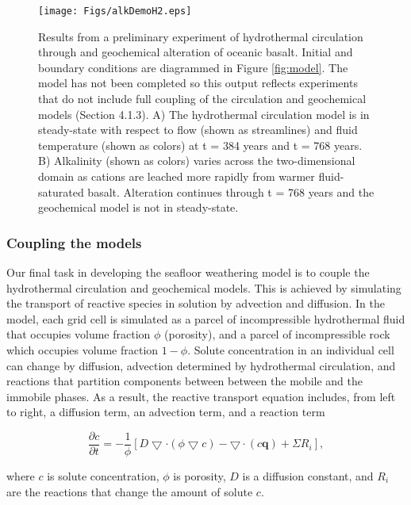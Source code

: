 \documentclass[authoryear,round,12pt]{article}
\begin{document}
\begin{figure}[h!]
\begin{center}
\texttt{[image: Figs/alkDemoH2.eps]}
\end{center}
\caption{Results from a preliminary experiment of hydrothermal circulation through and geochemical alteration of oceanic basalt. Initial and boundary conditions are diagrammed in Figure \ref{fig:model}. The model has not been completed so this output reflects experiments that do not include full coupling of the circulation and geochemical models (Section 4.1.3). A) The hydrothermal circulation model is in steady-state with respect to flow (shown as streamlines) and fluid temperature (shown as colors) at t = 384 years and t = 768 years. B) Alkalinity (shown as colors) varies across the two-dimensional domain as cations are leached more rapidly from warmer fluid-saturated basalt. Alteration continues through t = 768 years and the geochemical model is not in steady-state.}
\label{fig:alkDemoH}
\end{figure}

\subsubsection{Coupling the models}
\label{sec:coupling}

Our final task in developing the seafloor weathering model is to
couple the hydrothermal circulation and geochemical models. 
This is achieved by simulating the transport of reactive species 
in solution by advection and diffusion. In the
model, each grid cell is simulated as a parcel of incompressible
hydrothermal fluid that occupies volume fraction $\phi$ (porosity),
and a parcel of incompressible rock which occupies volume fraction $1
- \phi$. Solute concentration in an individual cell can change by diffusion, 
advection determined by hydrothermal circulation, and reactions that partition 
components between between the mobile and the immobile phases. As a 
result, the reactive transport equation includes, from left to right, a diffusion 
term, an advection term, and a reaction term

\begin{equation}
\frac{\partial c}{\partial t}  = -\frac{1}{\phi}[D \bigtriangledown \cdot (\phi \bigtriangledown c) - \bigtriangledown \cdot (c \textbf{q}) + \Sigma R_i],
\label{eq:adr}
\end{equation}

where $c$ is solute concentration, $\phi$ is porosity, $D$ is a
diffusion constant, and $R_i$ are the reactions that change the amount
of solute $c$.
\end{document}
